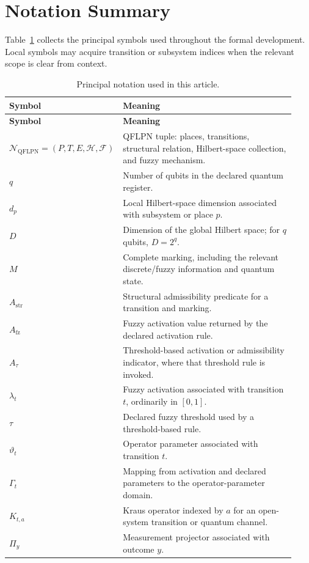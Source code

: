\documentclass[final,3p,times]{elsarticle}
\begin{document}
\section{Notation Summary}
Table~\ref{tab:p1-notation-summary} collects the principal symbols used throughout the formal development. Local symbols may acquire transition or subsystem indices when the relevant scope is clear from context.

\begin{longtable}{@{}p{0.24\linewidth}p{0.69\linewidth}@{}}
\caption{Principal notation used in this article.}\label{tab:p1-notation-summary}\\
\toprule
\textbf{Symbol} & \textbf{Meaning}\\
\midrule
\endfirsthead
\toprule
\textbf{Symbol} & \textbf{Meaning}\\
\midrule
\endhead
$\mathcal{N}_{\mathrm{QFLPN}}=(P,T,E,\mathcal{H},\mathcal{F})$ & QFLPN tuple: places, transitions, structural relation, Hilbert-space collection, and fuzzy mechanism.\\
$q$ & Number of qubits in the declared quantum register.\\
$d_p$ & Local Hilbert-space dimension associated with subsystem or place $p$.\\
$D$ & Dimension of the global Hilbert space; for $q$ qubits, $D=2^q$.\\
$M$ & Complete marking, including the relevant discrete/fuzzy information and quantum state.\\
$A_{\mathrm{str}}$ & Structural admissibility predicate for a transition and marking.\\
$A_{\mathrm{fz}}$ & Fuzzy activation value returned by the declared activation rule.\\
$A_{\tau}$ & Threshold-based activation or admissibility indicator, where that threshold rule is invoked.\\
$\lambda_t$ & Fuzzy activation associated with transition $t$, ordinarily in $[0,1]$.\\
$\tau$ & Declared fuzzy threshold used by a threshold-based rule.\\
$\vartheta_t$ & Operator parameter associated with transition $t$.\\
$\Gamma_t$ & Mapping from activation and declared parameters to the operator-parameter domain.\\
$K_{t,a}$ & Kraus operator indexed by $a$ for an open-system transition or quantum channel.\\
$\Pi_y$ & Measurement projector associated with outcome $y$.\\

\end{longtable}
\end{document}
